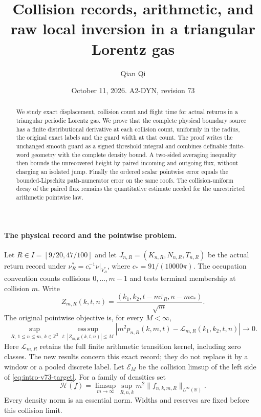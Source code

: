 \documentclass[11pt,reqno]{amsart}
\title[Collision records and raw local inversion]{Collision records, arithmetic, and raw local inversion in a triangular Lorentz gas}
\author{Qian Qi}
\date{October 11, 2026. A2-DYN, revision 73}
\numberwithin{equation}{section}
\theoremstyle{definition}\newtheorem{definition}[theorem]{Definition}
\theoremstyle{remark}\newtheorem{remark}[theorem]{Remark}
\newcommand{\R}{\mathbb R}\newcommand{\Z}{\mathbb Z}\newcommand{\T}{\mathbb T}
\begin{document}
\raggedbottom
\begin{abstract}
We study exact displacement, collision count and flight time for actual
returns in a triangular periodic Lorentz gas. We prove that the complete
physical boundary source has a finite distributional derivative at each
collision count, uniformly in the radius, the original exact labels and
the guard width at that count. The proof writes the unchanged smooth
guard as a signed threshold integral and combines definable finite-word
geometry with the complete density bound. A two-sided averaging inequality
then bounds the unrecovered height by paired incoming and outgoing flux,
without charging an isolated jump. Finally the ordered scalar pointwise
error equals the bounded-Lipschitz path-numerator error on the same roofs.
The collision-uniform decay of the paired flux remains the quantitative
estimate needed for the unrestricted arithmetic pointwise law.
\end{abstract}
\maketitle

\paragraph{The physical record and the pointwise problem.}
Let $R\in I=[9/20,47/100]$ and let
$J_{n,R}=(K_{n,R},N_{n,R},T_{n,R})$ be the actual return record
under $\nu_R^*=c_*^{-1}\nu|_{Y_R^*}$, where $c_*=91/(10000\pi)$.
The occupation convention counts collisions $0,\ldots,m-1$ and tests
terminal membership at collision $m$. Write
\[
 Z_{m,R}(k,t,n)=\frac{(k_1,k_2,t-m\bar\tau_R,n-mc_*)}{\sqrt m}.
\]
The original pointwise objective is, for every $M<\infty$,
\begin{equation}\label{eq:intro-v73-target}
 \sup_{R,\,1\le n\le m,\,k\in\Z^2}
 \operatorname*{ess\,sup}_{t:\,|Z_{m,R}(k,t,n)|\le M}
 |m^2p_{n,R}(k,m,t)-\mathcal L_{m,R}(k_1,k_2,t,n)|\longrightarrow0.
\end{equation}
Here $\mathcal L_{m,R}$ retains the full finite arithmetic transition
kernel, including zero classes. The new results concern this exact
record; they do not replace it by a window or a pooled discrete label.
Let $\mathcal E_M$ be the collision limsup of the left side of
\eqref{eq:intro-v73-target}. For a family of densities set
\begin{equation}\label{eq:intro-v73-ordered-height}
 \mathcal H(f)=\limsup_{m\to\infty}\sup_{R,n,k}m^2
                         \|f_{n,k,m,R}\|_{L^\infty(\R)}.
\end{equation}
Every density norm is an essential norm. Widths and reserves are fixed
before this collision limit.
\end{document}
